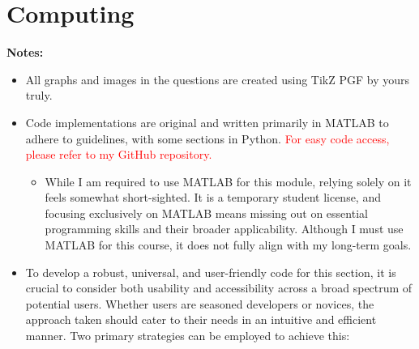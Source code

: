 \documentclass[a4paper, 12pt]{report}
\begin{document}
    \chapter{Computing}    
    \thispagestyle{empty}
    \vspace{3em}
    \begin{center}
        \Large\textbf{Notes:}
    \end{center}
    \vspace{1em}
    \begin{itemize} 
        \item All graphs and images in the questions are created using TikZ PGF by yours truly. 
        \item Code implementations are original and written primarily in MATLAB to adhere to guidelines, with some sections in Python. 
        \textcolor{red}{For easy code access, please refer to my GitHub repository.} 
        \begin{itemize} 
            \item While I am required to use MATLAB for this module, relying solely on it feels somewhat short-sighted. It is a temporary student license, and focusing exclusively on MATLAB means missing out on essential programming skills and their broader applicability. Although I must use MATLAB for this course, it does not fully align with my long-term goals. 
        \end{itemize} 
        \item To develop a robust, universal, and user-friendly code for this section, it is crucial to consider both usability and accessibility across a broad spectrum of potential users. Whether users are seasoned developers or novices, the approach taken should cater to their needs in an intuitive and efficient manner. Two primary strategies can be employed to achieve this:
        

\end{itemize}
\end{document}
